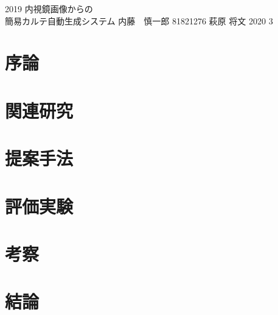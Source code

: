 \documentclass[a4j,12pt]{jreport}
\begin{document}
\begin{titlepage}
\thesis
{2019}                %
{内視鏡画像からの\\簡易カルテ自動生成システム}       %
{内藤　慎一郎}                %
{81821276}          %
{萩原 将文}         %
{2020}                %
{3} %
\end{titlepage}


\renewcommand{\thepage}{--\roman{page}--}

\jabstract


\eabstract{} %


\contents


\chapter{序論}


\chapter{関連研究}


\chapter{提案手法}


\chapter{評価実験}


\chapter{考察}


\chapter{結論}



\end{document}
